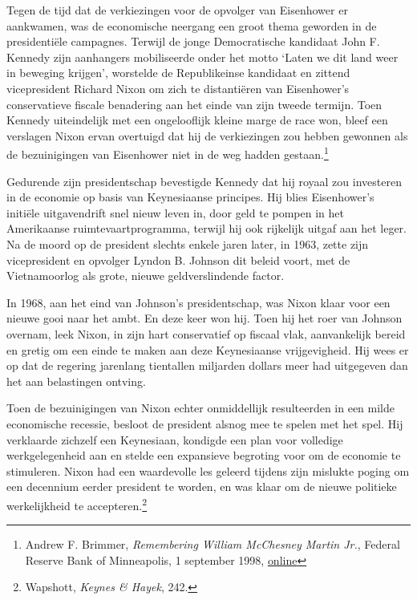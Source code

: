 \documentclass[
  a5paper,
  smalldemyvopaper,11pt,twoside,onecolumn,openright,extrafontsizes,
hidelinks]{memoir}
\begin{document}
Tegen de tijd dat de verkiezingen voor de opvolger van Eisenhower er
aankwamen, was de economische neergang een groot thema geworden in de
presidentiële campagnes. Terwijl de jonge Democratische kandidaat John
F. Kennedy zijn aanhangers mobiliseerde onder het motto `Laten we dit
land weer in beweging krijgen', worstelde de Republikeinse kandidaat en
zittend vicepresident Richard Nixon om zich te distantiëren van
Eisenhower's conservatieve fiscale benadering aan het einde van zijn
tweede termijn. Toen Kennedy uiteindelijk met een ongelooflijk kleine
marge de race won, bleef een verslagen Nixon ervan overtuigd dat hij de
verkiezingen zou hebben gewonnen als de bezuinigingen van Eisenhower
niet in de weg hadden gestaan.\footnote{\hspace{0pt}Andrew F. Brimmer,
  \emph{Remembering William McChesney Martin Jr.}, Federal Reserve Bank
  of Minneapolis, 1 september 1998,
  \href{https://www.minneapolisfed.org/article/1998/remembering-william-mcchesney-martin-jr.}{online}}

Gedurende zijn presidentschap bevestigde Kennedy dat hij royaal zou
investeren in de economie op basis van Keynesiaanse principes. Hij blies
Eisenhower's initiële uitgavendrift snel nieuw leven in, door geld te
pompen in het Amerikaanse ruimtevaartprogramma, terwijl hij ook
rijkelijk uitgaf aan het leger. Na de moord op de president slechts
enkele jaren later, in 1963, zette zijn vicepresident en opvolger Lyndon
B. Johnson dit beleid voort, met de Vietnamoorlog als grote, nieuwe
geldverslindende factor.

In 1968, aan het eind van Johnson's presidentschap, was Nixon klaar voor
een nieuwe gooi naar het ambt. En deze keer won hij. Toen hij het roer
van Johnson overnam, leek Nixon, in zijn hart conservatief op fiscaal
vlak, aanvankelijk bereid en gretig om een einde te maken aan deze
Keynesiaanse vrijgevigheid. Hij wees er op dat de regering jarenlang
tientallen miljarden dollars meer had uitgegeven dan het aan belastingen
ontving.

Toen de bezuinigingen van Nixon echter onmiddellijk resulteerden in een
milde economische recessie, besloot de president alsnog mee te spelen
met het spel. Hij verklaarde zichzelf een Keynesiaan, kondigde een plan
voor volledige werkgelegenheid aan en stelde een expansieve begroting
voor om de economie te stimuleren. Nixon had een waardevolle les geleerd
tijdens zijn mislukte poging om een decennium eerder president te
worden, en was klaar om de nieuwe politieke werkelijkheid te
accepteren.\footnote{\hspace{0pt}Wapshott, \emph{Keynes \& Hayek}, 242.}
\end{document}
